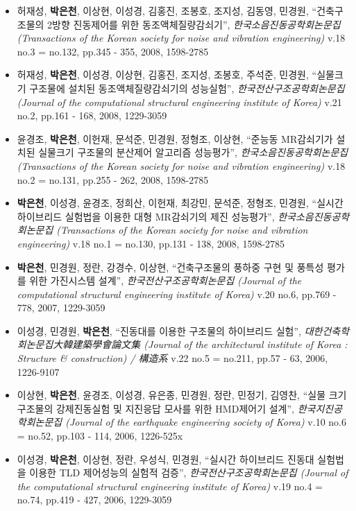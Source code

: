 \begin{itemize}
{  society for noise and vibration engineering)} v.18 no.5 = no.134,
  pp.485 - 495, 2008, 1598-2785
\item
  허재성, \textbf{박은천}, 이상현, 이성경, 김홍진, 조봉호, 조지성,
  김동영, 민경원, ``건축구조물의 2방향 진동제어를 위한
  동조액체질량감쇠기'', \emph{한국소음진동공학회논문집 (Transactions of
  the Korean society for noise and vibration engineering)} v.18 no.3 =
  no.132, pp.345 - 355, 2008, 1598-2785
\item
  허재성, \textbf{박은천}, 이성경, 이상현, 김홍진, 조지성, 조봉호,
  주석준, 민경원, ``실물크기 구조물에 설치된 동조액체질량감쇠기의
  성능실험'', \emph{한국전산구조공학회논문집 (Journal of the
  computational structural engineering institute of Korea)} v.21 no.2,
  pp.161 - 168, 2008, 1229-3059
\item
  윤경조, \textbf{박은천}, 이헌재, 문석준, 민경원, 정형조, 이상현,
  ``준능동 MR감쇠기가 설치된 실물크기 구조물의 분산제어 알고리즘
  성능평가'', \emph{한국소음진동공학회논문집 (Transactions of the Korean
  society for noise and vibration engineering)} v.18 no.2 = no.131,
  pp.255 - 262, 2008, 1598-2785
\item
  \textbf{박은천}, 이성경, 윤경조, 정희산, 이헌재, 최강민, 문석준,
  정형조, 민경원, ``실시간 하이브리드 실험법을 이용한 대형 MR감쇠기의
  제진 성능평가'', \emph{한국소음진동공학회논문집 (Transactions of the
  Korean society for noise and vibration engineering)} v.18 no.1 =
  no.130, pp.131 - 138, 2008, 1598-2785
\item
  \textbf{박은천}, 민경원, 정란, 강경수, 이상현, ``건축구조물의 풍하중
  구현 및 풍특성 평가를 위한 가진시스템 설계'',
  \emph{한국전산구조공학회논문집 (Journal of the computational
  structural engineering institute of Korea)} v.20 no.6, pp.769 - 778,
  2007, 1229-3059
\item
  이성경, 민경원, \textbf{박은천}, ``진동대를 이용한 구조물의 하이브리드
  실험'', \emph{대한건축학회논문집大韓建築學會論文集 (Journal of the
  architectural institute of Korea : Structure \& construction) /
  構造系} v.22 no.5 = no.211, pp.57 - 63, 2006, 1226-9107
\item
  이상현, \textbf{박은천}, 윤경조, 이성경, 유은종, 민경원, 정란, 민정기,
  김영찬, ``실물 크기 구조물의 강제진동실험 및 지진응답 모사를 위한
  HMD제어기 설계'', \emph{한국지진공학회논문집 (Journal of the
  earthquake engineering society of Korea)} v.10 no.6 = no.52, pp.103 -
  114, 2006, 1226-525x
\item
  이성경, \textbf{박은천}, 이상현, 정란, 우성식, 민경원, ``실시간
  하이브리드 진동대 실험법을 이용한 TLD 제어성능의 실험적 검증'',
  \emph{한국전산구조공학회논문집 (Journal of the computational
  structural engineering institute of Korea)} v.19 no.4 = no.74, pp.419
  - 427, 2006, 1229-3059
\end{itemize}

